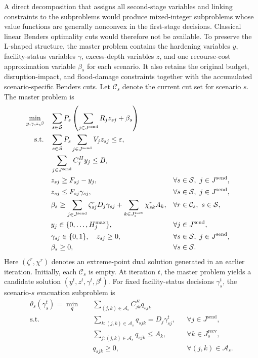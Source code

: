 \documentclass[preprint,11pt,authoryear]{elsarticle}
\begin{document}
A direct decomposition that assigns all second-stage variables and linking
constraints to the subproblems would produce mixed-integer subproblems whose
value functions are generally nonconvex in the first-stage decisions.
Classical linear Benders optimality cuts would therefore not be available.
To preserve the L-shaped structure, the master problem contains the hardening variables $y$, facility-status
variables $\gamma$, excess-depth variables $z$, and one recourse-cost
approximation variable $\beta_s$ for each scenario. It also retains the
original budget, disruption-impact, and flood-damage constraints together with
the accumulated scenario-specific Benders cuts. Let \(\mathcal C_s\) denote
the current cut set for scenario \(s\). The master problem is
\begin{align}
\min_{y,\gamma,z,\beta}\quad
& \sum_{s\in\mathcal S}P_s
\left(\sum_{j\in J^{\mathrm{send}}}R_jz_{sj}+\beta_s\right)
\label{MP:obj}
\\
\text{s.t.}\quad
& \sum_{s\in\mathcal S}P_s
\sum_{j\in J^{\mathrm{send}}}V_jz_{sj}\leq\varepsilon,
\label{MP:epsilon}
\\
& \sum_{j\in J^{\mathrm{send}}}C_j^Hy_j\leq B,
\label{MP:budget}
\\
& z_{sj}\geq F_{sj}-y_j,
&& \forall s\in\mathcal S,\ j\in J^{\mathrm{send}},
\label{MP:z_lb}
\\
& z_{sj}\leq F_{sj}\gamma_{sj},
&& \forall s\in\mathcal S,\ j\in J^{\mathrm{send}},
\label{MP:z_ub}
\\
& \beta_s\geq
\sum_{j\in J^{\mathrm{send}}}\zeta_{sj}^{r}D_j\gamma_{sj}
+\sum_{k\in J_s^{\mathrm{recv}}}\chi_{sk}^{r}A_k,
&& \forall r\in\mathcal C_s,\ s\in\mathcal S,
\label{MP:cuts}
\\
& y_j\in\{0,\ldots,H_j^{\max}\},
&& \forall j\in J^{\mathrm{send}},
\notag\\
& \gamma_{sj}\in\{0,1\},\quad z_{sj}\geq0,
&& \forall s\in\mathcal S,\ j\in J^{\mathrm{send}},
\notag\\
& \beta_s\geq0,
&& \forall s\in\mathcal S.
\notag
\end{align}
Here \((\zeta^r,\chi^r)\) denotes an extreme-point dual solution generated
in an earlier iteration. Initially, each \(\mathcal C_s\) is empty. At iteration $t$, the master problem yields a candidate solution
$(y^t,z^t,\gamma^t,\beta^t)$. For fixed facility-status decisions
$\gamma_s^t$, the scenario-$s$ evacuation subproblem is
\begin{align}
\theta_s(\gamma_s^t)
=
\min_q\quad
& \sum_{(j,k)\in\mathcal{A}_s}
C_{jk}^E q_{sjk}
\label{SP:obj}
\\[3pt]
\text{s.t.}\quad
& \sum_{k:(j,k)\in\mathcal{A}_s}
q_{sjk}
=
D_j\gamma_{sj}^t,
&& \forall j\in J^{\mathrm{send}},
\label{SP:supply}
\\
& \sum_{j:(j,k)\in\mathcal{A}_s}
q_{sjk}
\leq A_k,
&& \forall k\in J_s^{\mathrm{recv}},
\label{SP:capacity}
\\
& q_{sjk}\geq0,
&& \forall (j,k)\in\mathcal{A}_s.
\label{SP:domain}
\end{align}
\end{document}
